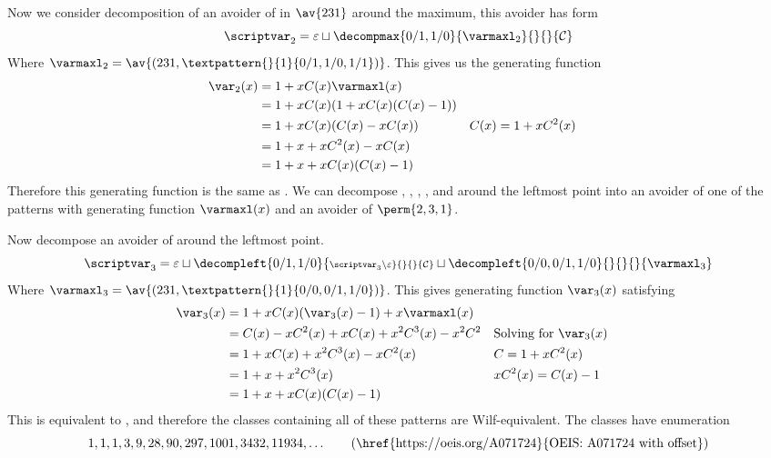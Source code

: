 Now we consider decomposition of an avoider of
  in \(\av{231}\) around the maximum,
this avoider has form
\begin{equation*}
    \scriptvar_2 = \varepsilon \sqcup
    \decompmax{0/1,1/0}{\mathcal{\varmaxl}_2}{}{}{\mathcal{C}}
\end{equation*}
Where \(\mathcal{\varmaxl}_2 = \av{(231,\textpattern{}{1}{0/1,1/0,1/1})}\).
This gives us the generating function
\begin{equation*}
    \begin{aligned}
        \var_2(x) &= 1+xC(x)\varmaxl(x)\\
        &= 1+xC(x)(1+xC(x)(C(x)-1))\\
        &= 1 +xC(x)(C(x)-xC(x)) && C(x) = 1+xC^2(x)\\
        &= 1 +x + xC^2(x) - xC(x) \\
        &= 1 +x + xC(x)(C(x)-1)
    \end{aligned}
\end{equation*}
Therefore this generating function is the same as .
We can decompose
,
,
,
,
and  around the leftmost point
into an avoider of one of the patterns with generating function \(\varmaxl(x)\) and
an avoider of \(\perm{2,3,1}\).

Now decompose an avoider of 
around the leftmost point.
\begin{equation*}
    \scriptvar_3 = \varepsilon \sqcup
    \decompleft{0/1,1/0}{\scriptstyle \scriptvar_3\setminus\varepsilon}{}{}{\mathcal{C}}
    \sqcup \decompleft{0/0,0/1,1/0}{}{}{}{\varmaxl_3}
\end{equation*}
Where \(\mathcal{\varmaxl}_3 = \av{(231,\textpattern{}{1}{0/0,0/1,1/0})}\).
This gives generating function \(\var_3(x)\) satisfying
\begin{equation*}
    \begin{aligned}
        \var_3(x) &= 1 +xC(x)(\var_3(x)-1) + x\varmaxl(x)\\
        &= C(x) - xC^2(x) + xC(x) +x^2C^3(x) - x^2C^2 && \text{Solving for \(\var_3(x)\)}\\
        &= 1 + xC(x) +x^2C^3(x)-xC^2(x) && C = 1+xC^2(x)\\
        &= 1 + x + x^2C^3(x) && xC^2(x) = C(x)-1\\
        &= 1 + x + xC(x)(C(x)-1)
    \end{aligned}
\end{equation*}
This is equivalent to , and therefore
the classes containing all of these patterns are Wilf-equivalent.
The classes have enumeration
\begin{equation*}
    1, 1, 1, 3, 9, 28, 90, 297, 1001, 3432, 11934,\dotsc \tag{\href{https://oeis.org/A071724}{OEIS: A071724 with offset}}
\end{equation*}
